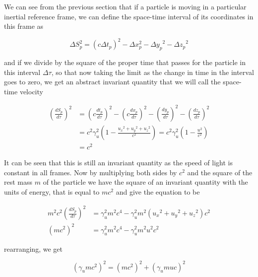We can see from the previous section that if a particle is moving in a particular inertial reference frame, we can define the space-time interval of its coordinates in this frame as

\begin{equation}
	\Delta S_p^2 = (c\Delta {t}_p)^2-\Delta x_p^2-{\Delta y_p}^2-{\Delta z_p}^2
\end{equation}

and if we divide by the square of the proper time that passes for the particle in this interval ${\Delta\tau}$, so that now taking the limit as the change in time in the interval goes to zero, we get an abstract invariant quantity that we will call the space-time velocity

\begin{equation}
	\begin{aligned}
		\left(\frac{dS_p}{d\tau}\right)^2 & = \left(c\frac{{{dt}_{p}}}{d\tau}\right)^2-\left(c\frac{dx_p}{d\tau}\right)^2-\left(\frac{dy_p}{d\tau}\right)^2-\left(\frac{dz_p}{d\tau}\right)^2 \\
		                                  & = {c}^2\gamma_{u}^2 \left( 1-\frac{{{u}_{x}}^2 + {{u}_{y}}^2 + {{u}_{z}}^2}{{c}^2} \right) = {c}^2\gamma_{u}^2 \left( 1-\frac{u^2}{{c}^2} \right) \\
		                                  & = {c}^2
	\end{aligned}
\end{equation}

It can be seen that this is still an invariant quantity as the speed of light is constant in all frames.
Now by multiplying both sides by ${c}^2$ and the square of the rest mass ${m}$ of the particle we have the square of an invariant quantity with the units of energy, that is equal to ${m}{c}^2$ and give the equation to be

\begin{equation}
	\label{eq: energy-momentum derivation}
	\begin{aligned}
		m^2 {c}^2 \left(\frac{dS_p}{d\tau}\right)^2 & = \gamma_{u}^2 m^2 c^4-\gamma_{u}^2 m^2 \left( {{u}_{x}}^2 + {{u}_{y}}^2 + {{u}_{z}}^2 \right) {c}^2 \\
		({m}{c}^2)^2                                & = \gamma_{u}^2 m^2 c^4-\gamma_{u}^2 m^2 u^2 {c}^2
	\end{aligned}
\end{equation}

rearranging, we get

\begin{equation}
	\label{eq: total relativistic energy}
	\left( \gamma_{u} m {c}^2 \right)^2 = ({m}{c}^2)^2 + \left( \gamma_{u} {m}{u}{c}\right)^2
\end{equation}

